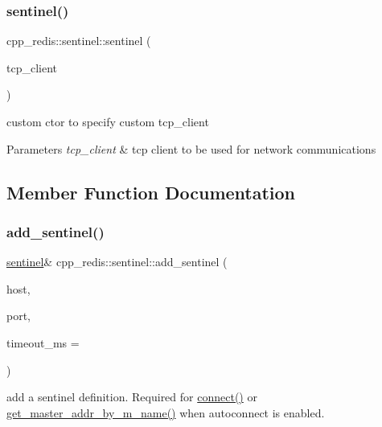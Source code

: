 \subsubsection{\texorpdfstring{sentinel()}{sentinel()}\hspace{0.1cm}{\footnotesize\ttfamily [2/2]}}
{\footnotesize\ttfamily cpp\+\_\+redis\+::sentinel\+::sentinel (\begin{DoxyParamCaption}\item[{const std\+::shared\+\_\+ptr$<$ \mbox{\hyperlink{classcpp__redis_1_1network_1_1tcp__client__iface}{network\+::tcp\+\_\+client\+\_\+iface}} $>$ \&}]{tcp\+\_\+client }\end{DoxyParamCaption})\hspace{0.3cm}{\ttfamily [explicit]}}

custom ctor to specify custom tcp\+\_\+client


\begin{DoxyParams}{Parameters}
{\em tcp\+\_\+client} & tcp client to be used for network communications \\
\hline
\end{DoxyParams}


\subsection{Member Function Documentation}
\mbox{\label{classcpp__redis_1_1sentinel_a6c846b71478c330d2cad7aa662dfd681}} 
\subsubsection{\texorpdfstring{add\+\_\+sentinel()}{add\_sentinel()}}
{\footnotesize\ttfamily \mbox{\hyperlink{classcpp__redis_1_1sentinel}{sentinel}}\& cpp\+\_\+redis\+::sentinel\+::add\+\_\+sentinel (\begin{DoxyParamCaption}\item[{const std\+::string \&}]{host,  }\item[{std\+::size\+\_\+t}]{port,  }\item[{std\+::uint32\+\_\+t}]{timeout\+\_\+ms = {} }\end{DoxyParamCaption})}

add a sentinel definition. Required for \mbox{\hyperlink{classcpp__redis_1_1sentinel_a1dfba8240daf7cfa7502f57957cffbda}{connect()}} or \mbox{\hyperlink{classcpp__redis_1_1sentinel_a2886493b40b00dfafdd3b22dfe28e0c3}{get\+\_\+master\+\_\+addr\+\_\+by\+\_\+m_name()}} when autoconnect is enabled.



